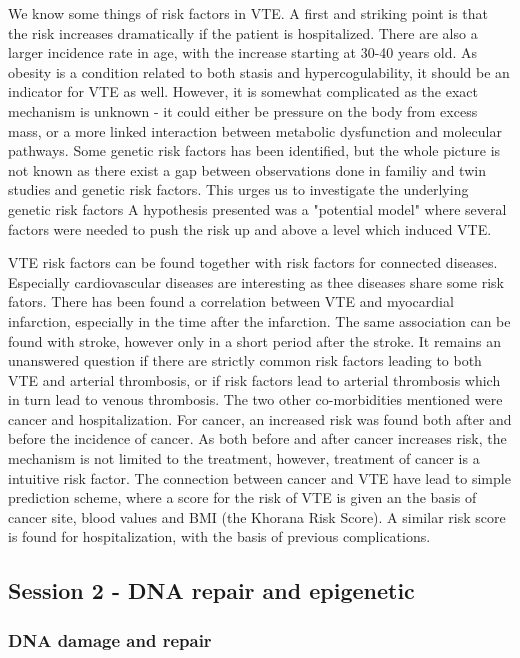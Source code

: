 \documentclass[12p]{article}
\begin{document}
We know some things of risk factors in VTE.
A first and striking point is that the risk increases dramatically if the patient is hospitalized.
There are also a larger incidence rate in age, with the increase starting at 30-40 years old.
As obesity is a condition related to both stasis and hypercogulability, it should be an indicator for VTE as well.
However, it is somewhat complicated as the exact mechanism is unknown - it could either be pressure on the body from excess mass, or a more linked interaction between metabolic dysfunction and molecular pathways.
Some genetic risk factors has been identified, but the whole picture is not known as there exist a gap between observations done in familiy and twin studies and genetic risk factors.
This urges us to investigate the underlying genetic risk factors
A hypothesis presented was a "potential model" where several factors were needed to push the risk up and above a level which induced VTE.

VTE risk factors can be found together with risk factors for connected diseases.
Especially cardiovascular diseases are interesting as thee diseases share some risk fators.
There has been found a correlation between VTE and myocardial infarction, especially in the time after the infarction.
The same association can be found with stroke, however only in a short period after the stroke.
It remains an unanswered question if there are strictly common risk factors leading to both VTE and arterial thrombosis, or if risk factors lead to arterial thrombosis which in turn lead to venous thrombosis.
The two other co-morbidities mentioned were cancer and hospitalization.
For cancer, an increased risk was found both after and before the incidence of cancer.
As both before and after cancer increases risk, the mechanism is not limited to the treatment, however, treatment of cancer is a intuitive risk factor.
The connection between cancer and VTE have lead to simple prediction scheme, where a score for the risk of VTE is given an the basis of cancer site, blood values and BMI (the Khorana Risk Score).
A similar risk score is found for hospitalization, with the basis of previous complications.

\subsection*{Session 2 - DNA repair and epigenetic}

\subsubsection*{DNA damage and repair}
\end{document}

